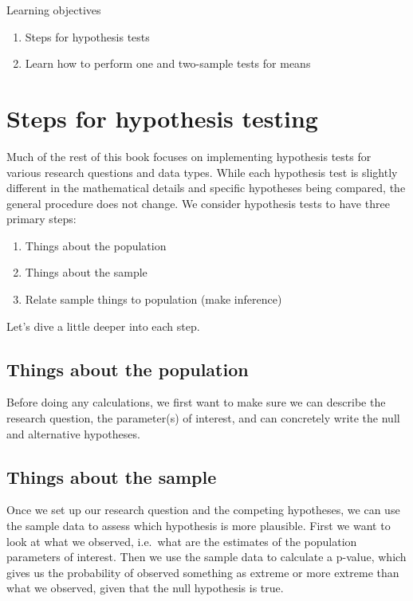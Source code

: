 \documentclass[
]{book}
\providecommand{\tightlist}{%
  \setlength{\itemsep}{0pt}\setlength{\parskip}{0pt}}
\theoremstyle{definition}
\theoremstyle{definition}
\theoremstyle{definition}
\theoremstyle{remark}
\begin{document}
Learning objectives

\begin{enumerate}
\def\labelenumi{\arabic{enumi}.}
\tightlist
\item
  Steps for hypothesis tests
\item
  Learn how to perform one and two-sample tests for means
\end{enumerate}

\hypertarget{ch8_s1}{%
\section{Steps for hypothesis testing}\label{ch8_s1}}

Much of the rest of this book focuses on implementing hypothesis tests for various research questions and data types. While each hypothesis test is slightly different in the mathematical details and specific hypotheses being compared, the general procedure does not change. We consider hypothesis tests to have three primary steps:

\begin{enumerate}
\def\labelenumi{\arabic{enumi}.}
\item
  Things about the population
\item
  Things about the sample
\item
  Relate sample things to population (make inference)
\end{enumerate}

Let's dive a little deeper into each step.

\hypertarget{things-about-the-population}{%
\subsection{Things about the population}\label{things-about-the-population}}

Before doing any calculations, we first want to make sure we can describe the research question, the parameter(s) of interest, and can concretely write the null and alternative hypotheses.

\hypertarget{things-about-the-sample}{%
\subsection{Things about the sample}\label{things-about-the-sample}}

Once we set up our research question and the competing hypotheses, we can use the sample data to assess which hypothesis is more plausible. First we want to look at what we observed, i.e.~what are the estimates of the population parameters of interest. Then we use the sample data to calculate a p-value, which gives us the probability of observed something as extreme or more extreme than what we observed, given that the null hypothesis is true.
\end{document}
